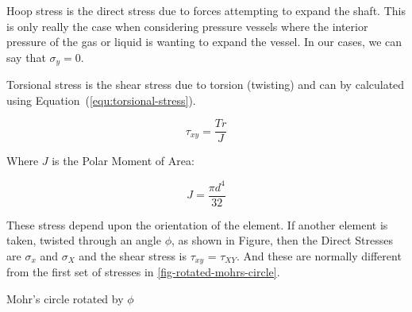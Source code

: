 Hoop stress is the direct stress due to forces attempting to expand the shaft. This is only really the case when considering pressure vessels where the interior pressure of the gas or liquid is wanting to expand the vessel. In our cases, we can say that \(\sigma_y = 0\). 

Torsional stress is the shear stress due to torsion (twisting) and can by calculated using Equation~(\ref{equ:torsional-stress}).

\begin{equation}
  \tau_{xy} = \frac{Tr}{J}
  \label{equ:torsional-stress}
\end{equation}

Where \(J\) is the Polar Moment of Area:

\begin{equation}
  J = \frac{\pi d^4}{32}
\end{equation}

These stress depend upon the orientation of the element. If another element is taken, twisted through an angle \(\phi\), as shown in Figure, then the Direct Stresses are \(\sigma_x\) and \(\sigma_X\) and the shear stress is \(\tau_{xy}\) = \(\tau_{XY}\). And these are normally different from the first set of stresses in \cref{fig-rotated-mohrs-circle}.

\begin{marginfigure}
  \center{}
  \caption{Mohr's circle rotated by \(\phi\)}
  \label{fig-rotated-mohrs-circle}
\end{marginfigure}

